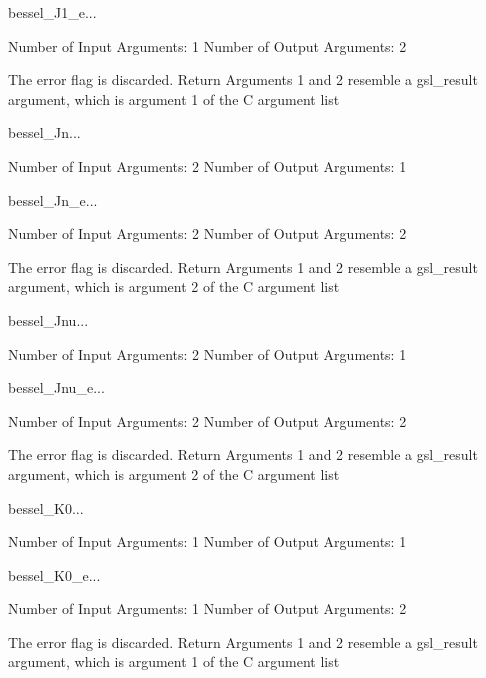 \begin{funcdesc}{bessel_J1_e}{...}

    Number of Input  Arguments:  1
    Number of Output Arguments:  2

The error flag is discarded.
Return Arguments 1 and 2 resemble a gsl_result argument,
	which is  argument 1 of the C argument list

\end{funcdesc}

\begin{funcdesc}{bessel_Jn}{...}

    Number of Input  Arguments:  2
    Number of Output Arguments:  1
\end{funcdesc}

\begin{funcdesc}{bessel_Jn_e}{...}

    Number of Input  Arguments:  2
    Number of Output Arguments:  2

The error flag is discarded.
Return Arguments 1 and 2 resemble a gsl_result argument,
	which is  argument 2 of the C argument list

\end{funcdesc}

\begin{funcdesc}{bessel_Jnu}{...}

    Number of Input  Arguments:  2
    Number of Output Arguments:  1
\end{funcdesc}

\begin{funcdesc}{bessel_Jnu_e}{...}

    Number of Input  Arguments:  2
    Number of Output Arguments:  2

The error flag is discarded.
Return Arguments 1 and 2 resemble a gsl_result argument,
	which is  argument 2 of the C argument list

\end{funcdesc}

\begin{funcdesc}{bessel_K0}{...}

    Number of Input  Arguments:  1
    Number of Output Arguments:  1
\end{funcdesc}

\begin{funcdesc}{bessel_K0_e}{...}

    Number of Input  Arguments:  1
    Number of Output Arguments:  2

The error flag is discarded.
Return Arguments 1 and 2 resemble a gsl_result argument,
	which is  argument 1 of the C argument list

\end{funcdesc}

